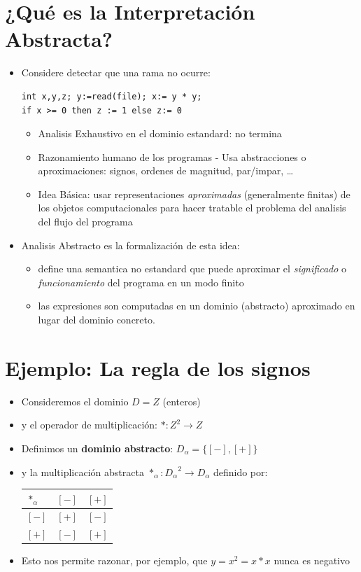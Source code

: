 \documentclass[11pt]{article}
\begin{document}
\section*{¿Qué es la Interpretación Abstracta?}
\label{sec:orge662b7a}

\begin{itemize}
\item Considere detectar que una rama no ocurre: 
\begin{verbatim}
int x,y,z; y:=read(file); x:= y * y;
if x >= 0 then z := 1 else z:= 0

\end{verbatim}
\begin{itemize}
\item Analisis Exhaustivo en el dominio estandard: no termina
\item Razonamiento humano de los programas - Usa abstracciones o
aproximaciones: signos, ordenes de magnitud, par/impar, \ldots{}
\item Idea Básica: usar representaciones \emph{aproximadas} (generalmente
finitas) de los objetos computacionales para hacer tratable el
problema del analisis del flujo del programa
\end{itemize}
\item Analisis Abstracto es la formalización de esta idea:
\begin{itemize}
\item define una semantica no estandard que puede aproximar el
\emph{significado} o \emph{funcionamiento} del programa en un modo finito
\item las expresiones son computadas en un dominio (abstracto)
aproximado en lugar del dominio concreto.
\end{itemize}
\end{itemize}

\section*{Ejemplo: La regla de los signos}
\label{sec:org5e371e7}

\begin{itemize}
\item Consideremos el dominio \(D = Z\) (enteros)
\item y el operador de multiplicación: \(* : Z^2 \to Z\)
\item Definimos un \textbf{dominio abstracto}: \(D_\alpha = \{[-],[+]\}\)
\item y la multiplicación abstracta \(*_\alpha : {D_\alpha}^2 \to D_\alpha\)
definido por: 
\begin{center}
\begin{tabular}{lll}
\(*_\alpha\) & \([-]\) & \([+]\)\\
\hline
\([-]\) & \([+]\) & \([-]\)\\
\([+]\) & \([-]\) & \([+]\)\\
\hline
\end{tabular}
\end{center}
\item Esto nos permite razonar, por ejemplo, que \(y=x^2=x*x\) nunca es
negativo
\end{itemize}
\end{document}
